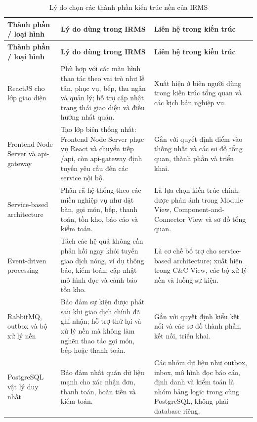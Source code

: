 {\small
\setlength{\LTleft}{0pt}
\setlength{\LTright}{0pt}
\setlength{\tabcolsep}{3pt}
\renewcommand{\arraystretch}{1.16}
\begin{longtable}{@{}>{\raggedright\arraybackslash}p{3.0cm} >{\raggedright\arraybackslash}p{5.0cm} >{\raggedright\arraybackslash}p{4.85cm}@{}}
\caption{Lý do chọn các thành phần kiến trúc nền của IRMS}\label{tab:appendix-component-rationale-core}\\
\toprule
\textbf{Thành phần / loại hình} & \textbf{Lý do dùng trong IRMS} & \textbf{Liên hệ trong kiến trúc} \\
\midrule
\endfirsthead
\toprule
\textbf{Thành phần / loại hình} & \textbf{Lý do dùng trong IRMS} & \textbf{Liên hệ trong kiến trúc} \\
\midrule
\endhead
\textsf{ReactJS} cho lớp giao diện & Phù hợp với các màn hình thao tác theo vai trò như lễ tân, phục vụ, bếp, thu ngân và quản lý; hỗ trợ cập nhật trạng thái giao diện và điều hướng nhất quán. & Xuất hiện ở biên người dùng trong kiến trúc tổng quan và các kịch bản nghiệp vụ. \\
\addlinespace
\textsf{Frontend Node Server} và \textsf{api-gateway} & Tạo lớp biên thống nhất: \textsf{Frontend Node Server} phục vụ React và chuyển tiếp \textsf{/api}, còn \textsf{api-gateway} định tuyến yêu cầu đến các service nội bộ. & Gắn với quyết định điểm vào thống nhất và các sơ đồ tổng quan, thành phần và triển khai. \\
\addlinespace
Service-based architecture & Phân rã hệ thống theo các miền nghiệp vụ như đặt bàn, gọi món, bếp, thanh toán, tồn kho, báo cáo và kiểm toán. & Là lựa chọn kiến trúc chính; được phản ánh trong Module View, Component-and-Connector View và sơ đồ tổng quan. \\
\addlinespace
Event-driven processing & Tách các hệ quả không cần phản hồi ngay khỏi tuyến giao dịch nóng, ví dụ thông báo, kiểm toán, cập nhật mô hình đọc và cảnh báo tồn kho. & Là cơ chế bổ trợ cho service-based architecture; xuất hiện trong C\&C View, các bộ xử lý nền và luồng sự kiện. \\
\addlinespace
\textsf{RabbitMQ}, outbox và bộ xử lý nền & Bảo đảm sự kiện được phát sau khi giao dịch chính đã ghi nhận; hỗ trợ thử lại và xử lý nền mà không làm nghẽn thao tác gọi món, bếp hoặc thanh toán. & Gắn với quyết định kiểu kết nối và các sơ đồ thành phần, kết nối, triển khai. \\
\addlinespace
\textsf{PostgreSQL} vật lý duy nhất & Bảo đảm nhất quán dữ liệu mạnh cho xác nhận đơn, thanh toán, hoàn tiền và kiểm toán. & Các nhóm dữ liệu như outbox, inbox, mô hình đọc báo cáo, định danh và kiểm toán là nhóm bảng logic trong cùng \textsf{PostgreSQL}, không phải database riêng. \\

\end{longtable}}
